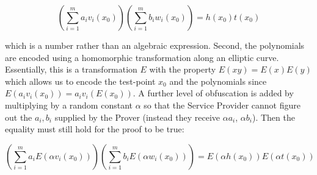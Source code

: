 \documentclass{article}
\begin{document}
\[\left(\sum_{i=1}^m a_iv_i(x_0)\right)\left(\sum_{i=1}^m b_iw_i(x_0)\right)=h(x_0)t(x_0)\]

which is a number rather than an algebraic expression. Second, the polynomials are encoded using a homomorphic transformation along an elliptic curve. Essentially, this is a transformation $E$ with the property $E(xy)=E(x)E(y)$ which allows us to encode the test-point $x_0$ and the polynomials since $E(a_iv_i(x_0))=a_iv_i(E(x_0))$. A further level of obfuscation is added by multiplying by a random constant $\alpha$ so that the Service Provider cannot figure out the $a_i,b_i$ supplied by the Prover (instead they receive $\alpha a_i$, $\alpha b_i$). Then the equality must still hold for the proof to be true:

\[\left(\sum_{i=1}^m a_i E(\alpha v_i(x_0))\right)\left(\sum_{i=1}^m b_i E(\alpha w_i(x_0))\right) = E(\alpha h(x_0))E(\alpha t(x_0))\]
\end{document}
